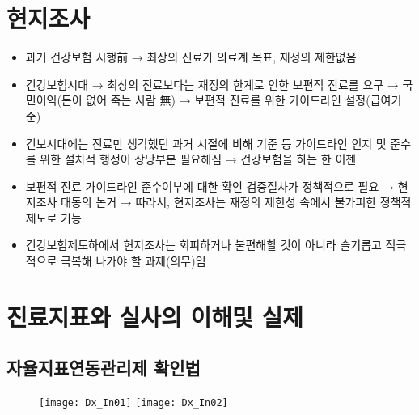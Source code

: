 ﻿\section{현지조사}
\begin{tcolorbox}[frogbox,title=현지조사는 왜 필요한가?(심평원의 시각)]
\begin{itemize}\tightlist
\item 과거 건강보험 시행前 → 최상의 진료가 의료계 목표, 재정의 제한없음
\item 건강보험시대 → 최상의 진료보다는 재정의 한계로 인한 보편적 진료를 요구 → 국민이익(돈이 없어 죽는 사람 無) → 보편적 진료를 위한 가이드라인 설정(급여기준)
\item 건보시대에는 진료만 생각했던 과거 시절에 비해 기준 등 가이드라인 인지 및 준수를 위한 절차적 행정이 상당부분 필요해짐 → 건강보험을 하는 한 이젠 
\item 보편적 진료 가이드라인 준수여부에 대한 확인 검증절차가 정책적으로 필요 → 현지조사 태동의 논거 → 따라서, 현지조사는 재정의 제한성 속에서 불가피한 정책적 제도로 기능
\item 건강보험제도하에서 현지조사는 회피하거나 불편해할 것이 아니라 슬기롭고 적극적으로 극복해 나가야 할 과제(의무)임
\end{itemize}
\end{tcolorbox}

\section{진료지표와 실사의 이해및 실제}
\subsection{자율지표연동관리제 확인법}
\begin{figure}
\centering
  \centering
  \texttt{[image: Dx\_In01]}
  \centering
  \texttt{[image: Dx\_In02]}
\end{figure}

